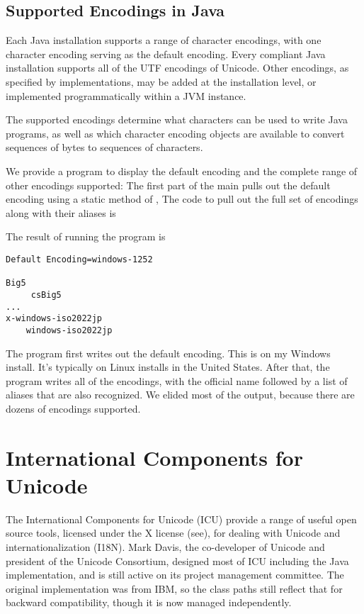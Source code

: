 \subsection{Supported Encodings in Java}\label{section:supported-encodings}

Each Java installation supports a range of character encodings, with
one character encoding serving as the default encoding.  Every
compliant Java installation supports all of the UTF encodings of
Unicode.  Other encodings, as specified by 
implementations, may be added at the installation level, or
implemented programmatically within a JVM instance.

The supported encodings determine what characters can be used to write
Java programs, as well as which character encoding objects are
available to convert sequences of bytes to sequences of characters.

We provide a program to
display the default encoding and the complete range of other encodings
supported:
%
%
The first part of the main pulls out the default encoding
using a static method of ,
%
%
The code to pull out the full set of encodings along with their
aliases is
%

The result of running the program is
%
\begin{verbatim}
Default Encoding=windows-1252

Big5
     csBig5
...
x-windows-iso2022jp
    windows-iso2022jp
\end{verbatim}
%
The program first writes out the default encoding.  This is
 on my Windows install.  It's typically
 on Linux installs in the United States.
After that, the program writes all of the encodings, with the official
name followed by a list of aliases that are also recognized.  We
elided most of the output, because there are dozens of encodings
supported.


\section{International Components for Unicode}

The International Components for Unicode (ICU) provide a range of
useful open source tools, licensed under the X license
(see), for dealing with Unicode and
internationalization (I18N).  Mark Davis, the co-developer of Unicode
and president of the Unicode Consortium, designed most of ICU
including the Java implementation, and is still active on its project
management committee.  The original implementation was from IBM, so
the class paths still reflect that for backward compatibility, though
it is now managed independently.

